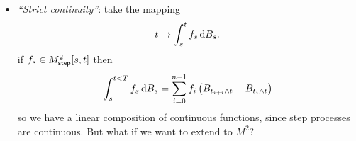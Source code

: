 \documentclass[12pt]{report}
\begin{document}
\begin{itemize}
\begin{fancyproof}
\begin{enumerate}[\circnum]
			\item \textit{Martingale property}: we have that 
			\begin{equation*}
				I^{(n)}_{t}=\int_{0}^{t}\phi^{(n)}_{s}\dbs
			\end{equation*}
			so for $s>t$ we get
			\begin{align*}
				\ev{I^{(n)}_{t}|\F_{t}}&=\ev{\left.\int_{s}^{t}\phi^{(n)}_{t}\dif B_{r}+\int_{t}^{s}\phi^{(n)}_{t}\dif B_{r}\right|\F_{t}}\\
				&=\int_{s}^{t}\phi^{(n)}_{r}\dif B_{r}+\ev{\left.\int_{t}^{s}\phi^{(n)}_{r}\dif B_{r}\right|\F_{t}}
			\end{align*}
			so we need to prove that in the $L^{2}$ limit we have that 
			\begin{equation*}
				\ubracketthin{\int_{s}^{t}\phi^{(n)}_{r}\dif B_{r}}_{\to I^{(n)}_{t}}+\ubracketthin{\ev{\left.\int_{t}^{s}\phi^{(n)}_{r}\dif B_{r}\right|\F_{t}}}_{\to0}.
			\end{equation*}
			So we have
			\begin{align*}
				\ev{\left.\int_{t}^{s}\phi^{(n)}_{r}\dif B_{r}\right|\F_{t}}&=\ev{\left.\int_{t}^{s}\sum_{j=0}^{n-1}m_{j}^{(n)}\indi_{\left[t^{(n)}_{j},t^{(n)}_{j+1}\right]}(t)\dif B_{r}\right|\F_{t}}\\
				&=\sum_{t\leq t_{j}^{(n)}\leq t^{(n)}_{j+1}}\ev{\left.m^{(n)}_{j}\left(B_{t^{(n)}_{j+1}}-B_{t^{(n)}_{j}}\right)\right|\F_{t}}\\
				\text{\footnotesize tower p.ty}\quad&=\sum_{t\leq t^{(n)}_{j}\leq t^{(n)}_{j+1}}\evs\Biggl[m_{j}^{(n)}\ubracketthin{\ev{\left.B_{t_{j+1}}-B_{t_{j}}\right|\F_{t_{j}}}}_{=0}\Big|\F_{t}\Biggr]\\
				&=0
			\end{align*}
			so it is verified. \hfill\faCheckCircle[regular]
		\end{enumerate}
	\end{fancyproof}
	\item \emph{``Strict continuity''}: take the mapping
	\begin{equation*}
		t\mapsto\int_{s}^{t}f_{s}\mathop{}\!\mathrm{d} B_{s}.
	\end{equation*}
	if $f_{s}\in M^{2}_{\mathsf{step}}[s,t]$ then
	\begin{equation*}
		\int_{s}^{t<T}f_{s}\mathop{}\!\mathrm{d} B_{s}=\sum_{i=0}^{n-1}f_{i}\left(B_{t_{i+i}\wedge t}-B_{t_{i}\wedge t}\right)
	\end{equation*}
	so we have a linear composition of continuous functions, since step processes are continuous. But what if we want to extend to $M^{2}$?
	\begin{theorem}

\end{theorem}
\end{itemize}
\end{document}
